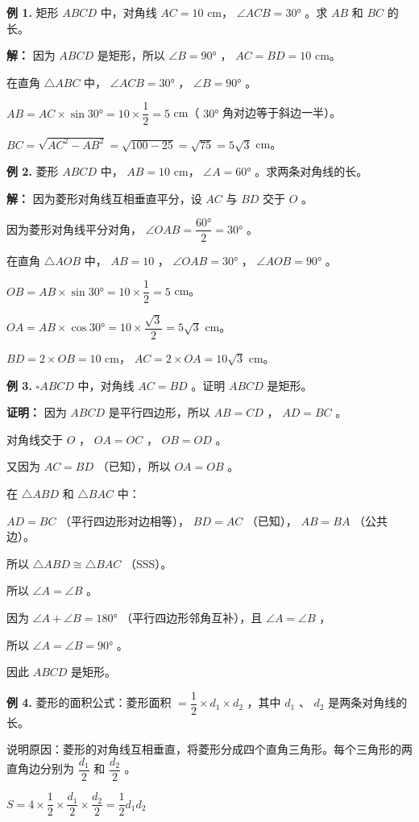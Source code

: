 \begin{workedexamples}


\textbf{例 1.} 矩形 $ABCD$ 中，对角线 $AC = 10$ cm， $\angle ACB = 30°$ 。求 $AB$ 和 $BC$ 的长。

\textbf{解：}
因为 $ABCD$ 是矩形，所以 $\angle B = 90°$ ， $AC = BD = 10$ cm。

在直角 $\triangle ABC$ 中， $\angle ACB = 30°$ ， $\angle B = 90°$ 。

$AB = AC \times \sin 30° = 10 \times \dfrac{1}{2} = 5$ cm（ $30°$ 角对边等于斜边一半）。

$BC = \sqrt{AC^2 - AB^2} = \sqrt{100 - 25} = \sqrt{75} = 5\sqrt{3}$ cm。

\textbf{例 2.} 菱形 $ABCD$ 中， $AB = 10$ cm， $\angle A = 60°$ 。求两条对角线的长。

\textbf{解：}
因为菱形对角线互相垂直平分，设 $AC$ 与 $BD$ 交于 $O$ 。

因为菱形对角线平分对角， $\angle OAB = \dfrac{60°}{2} = 30°$ 。

在直角 $\triangle AOB$ 中， $AB = 10$ ， $\angle OAB = 30°$ ， $\angle AOB = 90°$ 。

$OB = AB \times \sin 30° = 10 \times \dfrac{1}{2} = 5$ cm。

$OA = AB \times \cos 30° = 10 \times \dfrac{\sqrt{3}}{2} = 5\sqrt{3}$ cm。

$BD = 2 \times OB = 10$ cm， $AC = 2 \times OA = 10\sqrt{3}$ cm。

\textbf{例 3.} $\square ABCD$ 中，对角线 $AC = BD$ 。证明 $ABCD$ 是矩形。

\textbf{证明：}
因为 $ABCD$ 是平行四边形，所以 $AB = CD$ ， $AD = BC$ 。

对角线交于 $O$ ， $OA = OC$ ， $OB = OD$ 。

又因为 $AC = BD$ （已知），所以 $OA = OB$ 。

在 $\triangle ABD$ 和 $\triangle BAC$ 中：

$AD = BC$ （平行四边形对边相等）， $BD = AC$ （已知）， $AB = BA$ （公共边）。

所以 $\triangle ABD \cong \triangle BAC$ （SSS）。

所以 $\angle A = \angle B$ 。

因为 $\angle A + \angle B = 180°$ （平行四边形邻角互补），且 $\angle A = \angle B$ ，

所以 $\angle A = \angle B = 90°$ 。

因此 $ABCD$ 是矩形。

\textbf{例 4.} 菱形的面积公式：菱形面积 $= \dfrac{1}{2} \times d_1 \times d_2$ ，其中 $d_1$ 、 $d_2$ 是两条对角线的长。

说明原因：菱形的对角线互相垂直，将菱形分成四个直角三角形。每个三角形的两直角边分别为 $\dfrac{d_1}{2}$ 和 $\dfrac{d_2}{2}$ 。

$S = 4 \times \dfrac{1}{2} \times \dfrac{d_1}{2} \times \dfrac{d_2}{2} = \dfrac{1}{2}d_1 d_2$

\end{workedexamples}

